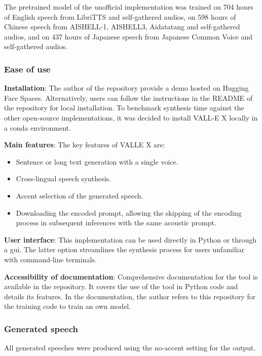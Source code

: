 The pretrained model of the unofficial implementation was trained on 704 hours of English speech from LibriTTS and self-gathered audios, on 598 hours of Chinese speech from  AISHELL-1, AISHELL3, Aidatatang and self-gathered audios, and on 437 hours of Japanese speech from Japanese Common Voice and self-gathered audios\cite{noauthor_demo_nodate}.

\subsubsection{Ease of use}
\textbf{Installation}: The author of the repository provide a demo hosted on Hugging Face Spaces\cite{vallex_hugging_face}. Alternatively, users can follow the instructions in the README of the repository for local installation\cite{songting_vall-e_2023}. To benchmark synthesis time against the other open-source implementations, it was decided to install VALL-E X locally in a conda environment.

\textbf{Main features}:
The key features of VALLE X are:
\begin{itemize}
    \item Sentence or long text generation with a single voice.
    \item Cross-lingual speech synthesis.
    \item Accent selection of the generated speech.
    \item Downloading the encoded prompt, allowing the skipping of the encoding process in subsequent inferences with the same acoustic prompt.
\end{itemize}

\textbf{User interface}:
This implementation can be used directly in Python or through a \gls{gui}. The latter option streamlines the synthesis process for users unfamiliar with command-line terminals.

\textbf{Accessibility of documentation}: Comprehensive documentation for the tool is available in the repository\cite{songting_vall-e_2023}. It covers the use of the tool in Python code and details its features. In the documentation, the author refers to this repository\cite{valle} for the training code to train an own model.

\subsubsection{Generated speech}
All generated speeches were produced using the no-accent setting for the output.

